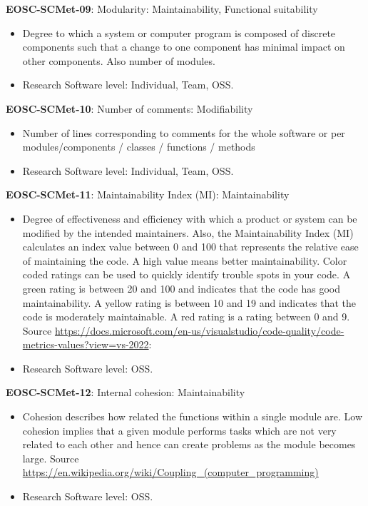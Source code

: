 \textbf{EOSC-SCMet-09}: Modularity: Maintainability, Functional suitability

\begin{itemize}
    \item Degree to which a system or computer program is composed of discrete components such that a change to
one component has minimal impact on other components. Also number of modules.~\cite{iso_25010_2011_2017,montagud_systematic_2012,aberdour_achieving_2007,ogasawara_experiences_1996,shepherdson_cessda_2019}
    \item Research Software level: Individual, Team, OSS.
\end{itemize}

\textbf{EOSC-SCMet-10}: Number of comments: Modifiability

\begin{itemize}
    \item Number of lines corresponding to comments for the whole software or per modules/components / classes / functions / methods~\cite{srisopha_software_2018,montagud_systematic_2012,ogasawara_experiences_1996}
    \item Research Software level: Individual, Team, OSS.
\end{itemize}

\textbf{EOSC-SCMet-11}: Maintainability Index (MI): Maintainability

\begin{itemize}
    \item Degree of effectiveness and efficiency with which a product or system can be modified by the intended
maintainers. Also, the Maintainability Index (MI) calculates an index value between 0 and 100 that represents the relative ease of maintaining the code. A high value means better maintainability. Color coded ratings can be used to quickly identify trouble spots in your code. A green rating is between 20 and 100 and indicates that the code has good maintainability. A yellow rating is between 10 and 19 and indicates that the code is moderately maintainable. A red rating is a rating between 0 and 9. Source \url{https://docs.microsoft.com/en-us/visualstudio/code-quality/code-metrics-values?view=vs-2022}: ~\cite{iso_25010_2011_2017,montagud_systematic_2012}
    \item Research Software level: OSS.
\end{itemize}

\textbf{EOSC-SCMet-12}: Internal cohesion: Maintainability

\begin{itemize}
    \item Cohesion describes how related the functions within a single module are. Low cohesion implies that a given module performs tasks which are not very related to each other and hence can create problems as the module becomes large. Source \url{https://en.wikipedia.org/wiki/Coupling_(computer_programming)}~\cite{iso_central_secretary_isoiecieee_2010,montagud_systematic_2012}
    \item Research Software level: OSS.
\end{itemize}

